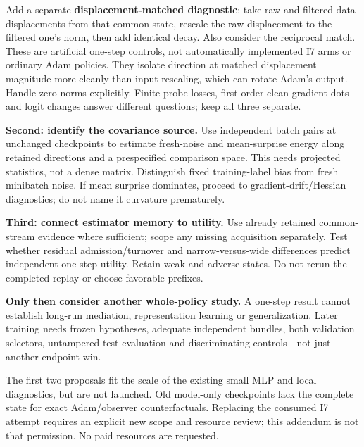 \documentclass[
  british,
  10pt,
  a4paper,
]{article}
\begin{document}
Add a separate \textbf{displacement\allowbreak{}-\allowbreak{}matched
diagnostic}: take raw and filtered data displacements from that common
state, rescale the raw displacement to the filtered one's norm, then add
identical decay. Also consider the reciprocal match. These are
artificial one-step controls, not automatically implemented I7 arms or
ordinary Adam policies. They isolate direction at matched displacement
magnitude more cleanly than input rescaling, which can rotate Adam's
output. Handle zero norms explicitly.\allowbreak{} Finite probe losses,
first-\allowbreak{}order clean-\allowbreak{}gradient dots and logit
changes answer different questions; keep all three separate.

\textbf{Second: identify the covariance source.} Use independent batch
pairs at unchanged checkpoints to estimate fresh-\allowbreak{}noise and
mean-\allowbreak{}surprise energy along retained directions and a
prespecified comparison space. This needs projected
statistics,\allowbreak{} not a dense matrix. Distinguish fixed
training-\allowbreak{}label bias from fresh minibatch noise. If mean
surprise dominates, proceed to
gradient-\allowbreak{}drift/\allowbreak{}Hessian diagnostics; do not
name it curvature prematurely.\allowbreak{}

\textbf{Third: connect estimator memory to utility.} Use already
retained common-\allowbreak{}stream evidence where sufficient; scope any
missing acquisition separately.\allowbreak{} Test whether residual
admission/\allowbreak{}turnover and
narrow-\allowbreak{}versus-\allowbreak{}wide differences predict
independent one-step utility. Retain weak and adverse states. Do not
rerun the completed replay or choose favorable prefixes.

\textbf{Only then consider another whole-\allowbreak{}policy study.} A
one-step result cannot establish long-run mediation, representation
learning or generalizati\allowbreak{}on.\allowbreak{} Later training
needs frozen hypotheses,\allowbreak{} adequate independent bundles, both
validation selectors, untampered test evaluation and discriminating
controls---not just another endpoint win.

The first two proposals fit the scale of the existing small MLP and
local diagnostics,\allowbreak{} but are not launched. Old model-only
checkpoints lack the complete state for exact Adam/\allowbreak{}observer
counterfactu\allowbreak{}als.\allowbreak{} Replacing the consumed I7
attempt requires an explicit new scope and resource review; this
addendum is not that permission.\allowbreak{} No paid resources are
requested.
\end{document}
